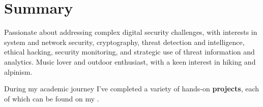 
\section{Summary}

    \begin{onecolentry}
        Passionate about addressing complex digital security challenges, with interests in system and network security, cryptography, threat detection and intelligence, ethical hacking, security monitoring, and strategic use of threat information and analytics.
        Music lover and outdoor enthusiast, with a keen interest in hiking and alpinism.
    \end{onecolentry}

    \vspace{0.1 cm} %

    \begin{onecolentry}
        During my academic journey I've completed a variety of hands-on \textbf{projects}, each of which can be found on my \hspace{0em} \mbox{}.
    \end{onecolentry}

